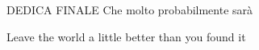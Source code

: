 DEDICA FINALE
\thispagestyle{empty}
Che molto probabilmente sarà

\vspace{2cm}
\centering Leave the world a little better than you found it